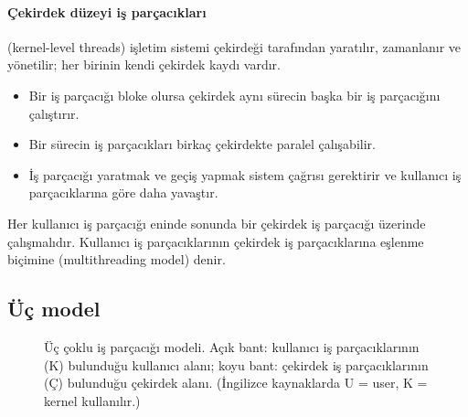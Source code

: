 \paragraph{Çekirdek düzeyi iş parçacıkları} (kernel-level threads) işletim sistemi çekirdeği tarafından yaratılır, zamanlanır ve yönetilir; her birinin kendi çekirdek kaydı vardır.
\begin{itemize}
  \item[\textcolor{mintdeep}{$+$}] Bir iş parçacığı bloke olursa çekirdek aynı sürecin başka bir iş parçacığını çalıştırır.
  \item[\textcolor{mintdeep}{$+$}] Bir sürecin iş parçacıkları birkaç çekirdekte paralel çalışabilir.
  \item[\textcolor{red!60!black}{$-$}] İş parçacığı yaratmak ve geçiş yapmak sistem çağrısı gerektirir ve kullanıcı iş parçacıklarına göre daha yavaştır.
\end{itemize}

Her kullanıcı iş parçacığı eninde sonunda bir çekirdek iş parçacığı üzerinde çalışmalıdır. Kullanıcı iş parçacıklarının çekirdek iş parçacıklarına eşlenme biçimine  (multithreading model) denir.

\subsection{Üç model}

\begin{figure}[H]
\centering
{}
\caption{Üç çoklu iş parçacığı modeli. Açık bant: kullanıcı iş parçacıklarının (K) bulunduğu kullanıcı alanı; koyu bant: çekirdek iş parçacıklarının (Ç) bulunduğu çekirdek alanı. (İngilizce kaynaklarda U = user, K = kernel kullanılır.)}
\end{figure}

